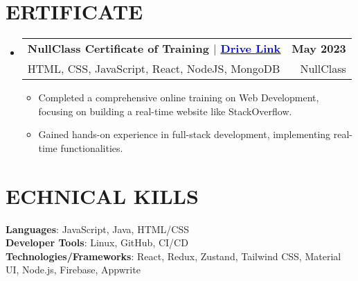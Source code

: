 \documentclass[letterpaper,11pt]{article}
\makeatletter
\newcommand{\resumeItem}[1]{
  \item\small{
    {#1 \vspace{-2pt}}
  }
}
\newcommand{\resumeSubheading}[4]{
  \vspace{-2pt}\item
    \begin{tabular*}{1.0\textwidth}[t]{l@{\extracolsep{\fill}}r}
      \textbf{#1} & \textbf{\small #2} \\
      #3 & #4 \\
    \end{tabular*}\vspace{-7pt}
}
\newcommand{\resumeSubHeadingListStart}{\begin{itemize}[leftmargin=0.0in, label={}]}
\newcommand{\resumeSubHeadingListEnd}{\end{itemize}}
\newcommand{\resumeItemListStart}{\begin{itemize}}
\newcommand{\resumeItemListEnd}{\end{itemize}\vspace{-5pt}}
\makeatother
\begin{document}
\section{\textrm{\scalebox{1.2}{C}ERTIFICATE}}

    \resumeSubHeadingListStart
    \resumeSubheading
        {NullClass Certificate of Training $|$ \href{https://drive.google.com/file/d/1GZ8qfVwk2DCE8oYuyjaqF5XNRdcQWHjE/view}{\raisebox{0.09\height}{\scalebox{0.8}{\faFileContract}} \underline{\textcolor{Blue}{\textnormal{Drive Link}}}}}
        {May 2023}
        {HTML, CSS, JavaScript, React, NodeJS, MongoDB}
        {NullClass}
        \resumeItemListStart
            \resumeItem{Completed a comprehensive online training on Web Development, focusing on building a real-time website like StackOverflow.}
            \resumeItem{Gained hands-on experience in full-stack development, implementing real-time functionalities.}
        \resumeItemListEnd
    \vspace{5pt}
\resumeSubHeadingListEnd


%
\section{\textrm{\scalebox{1.2}{T}ECHNICAL \scalebox{1.2}{S}KILLS}}

 \begin{itemize}[leftmargin=0.15in, label={}]
    \small{\item{
     \textbf{Languages}{: JavaScript, Java, HTML/CSS} \\
     \textbf{Developer Tools}{: Linux, GitHub, CI/CD} \\
     \textbf{Technologies/Frameworks}{: React, Redux, Zustand, Tailwind CSS, Material UI, Node.js, Firebase, Appwrite} \\
    }}
 \end{itemize}
 \vspace{-16pt}
\end{document}
